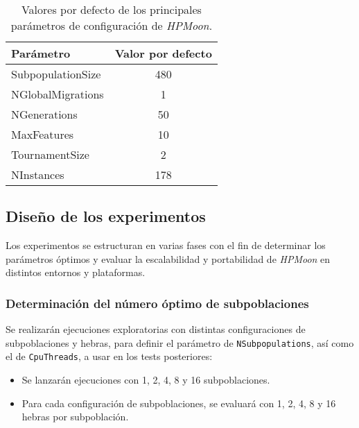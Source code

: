 \begin{table}[htbp]
    \centering
    \begin{tabular}{|l|c|}
        \hline
        \textbf{Parámetro} & \textbf{Valor por defecto} \\
        \hline
        SubpopulationSize  & 480                        \\
        NGlobalMigrations  & 1                          \\
        NGenerations       & 50                         \\
        MaxFeatures        & 10                         \\
        TournamentSize     & 2                          \\
        NInstances         & 178                        \\
        \hline
    \end{tabular}
    \caption{Valores por defecto de los principales parámetros de configuración de \textit{HPMoon}.}
    \label{tab:HPMoon_default_params}
\end{table}

\subsection{Diseño de los experimentos}\label{subsec:diseno_experimentos_detallado}

Los experimentos se estructuran en varias fases con el fin de determinar los parámetros óptimos y evaluar la escalabilidad y portabilidad de \textit{HPMoon} en distintos entornos y plataformas.

\subsubsection{Determinación del número óptimo de subpoblaciones}\label{subsubsec:determinacion_subpoblaciones}

Se realizarán ejecuciones exploratorias con distintas configuraciones de subpoblaciones y hebras, para definir el parámetro de \texttt{NSubpopulations}, así como el de \texttt{CpuThreads}, a usar en los tests posteriores:

\begin{itemize}
    \item Se lanzarán ejecuciones con 1, 2, 4, 8 y 16 subpoblaciones.
    \item Para cada configuración de subpoblaciones, se evaluará con 1, 2, 4, 8 y 16 hebras por subpoblación.
\end{itemize}

